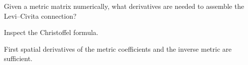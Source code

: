 \begin{exercise}\label{exr:vii22-ped-16}
Given a metric matrix numerically, what derivatives are needed to assemble the Levi--Civita connection?
\end{exercise}

\begin{hint}
Inspect the Christoffel formula.
\end{hint}

\begin{solution}
First spatial derivatives of the metric coefficients and the inverse metric are sufficient.
\end{solution}

